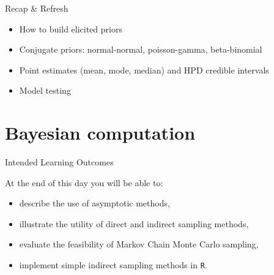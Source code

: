 
\begin{frame}{Recap \& Refresh}

        \begin{itemize}
                \item How to build elicited priors
		\item Conjugate priors: normal-normal, poisson-gamma, beta-binomial
		\item Point estimates (mean, mode, median) and HPD credible intervals
		\item Model testing
        \end{itemize}

\end{frame}

\section{Bayesian computation}

\begin{frame}{Intended Learning Outcomes}

        At the end of this day you will be able to:
        \begin{itemize}
		\item describe the use of asymptotic methods,
		\item illustrate the utility of direct and indirect sampling methods,
		\item evaluate the feasibility of Markov Chain Monte Carlo sampling,
                \item implement simple indirect sampling methods in \texttt{R}.
        \end{itemize}

\end{frame}


